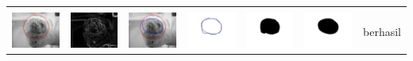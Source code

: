 \begin{table}[H]
\begin{tabular}{|m{0.7in}|m{0.7in}|m{0.7in}|m{0.7in}|m{0.7in}|m{0.7in}|m{0.7in}|}
		&  &  & & & &  \\
		\includegraphics[width=0.7in]{dataset/dataset_3/luka_kuning/ready/42_interp_init.jpg}&
		\includegraphics[width=0.7in]{dataset/dataset_3/luka_kuning/ready/42_interp_ext.jpg}&
		\includegraphics[width=0.7in]{dataset/dataset_3/luka_kuning/ready/42_interp_result.jpg}&
		\includegraphics[width=0.7in]{dataset/dataset_3/luka_kuning/ready/42_gt_r.jpg}&
		\includegraphics[width=0.7in]{dataset/dataset_3/luka_kuning/ready/42_r.jpg}&
		\includegraphics[width=0.7in]{dataset/dataset_3/luka_kuning/ready/42_interp_r.jpg}&
		berhasil\\
		\hline
		

\end{tabular}
\end{table}
